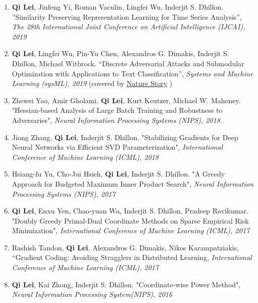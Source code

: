 \documentclass[margin, 10pt]{res} %
\begin{document}
\begin{resume}
\begin{enumerate}
  \item{ \textbf{Qi Lei}, Jinfeng Yi, Roman Vaculin, Lingfei Wu, Inderjit S. 
      Dhillon. ''Similarity Preserving Representation Learning for Time Series 
      Analysis'', \textit{The 28th International Joint Conference on Artificial 
    Intelligence (IJCAI), 2019}}
  \item{\textbf{Qi Lei}, Lingfei Wu, Pin-Yu Chen, Alexandros G. Dimakis, Inderjit S. 
    Dhillon, Michael Witbrock. ``Discrete Adversarial Attacks and Submodular 
    Optimization with Applications to Text Classification'', \textit{Systems and Machine 
  Learning (sysML), 2019} (covered by \href{https://www.nature.com/articles/d41586-019-01510-1}{Nature Story} )   }
  \item{Zhewei Yao, Amir Gholami, \textbf{Qi Lei}, Kurt Keutzer, Michael W. Mahoney. "Hessian-based Analysis of Large Batch Training and Robustness to Adversaries", \textit{Neural Information Processing Systems (NIPS), 2018}}
  \item{Jiong Zhang, \textbf{Qi Lei}, Inderjit S. Dhillon. 
       "Stabilizing Gradients for Deep 
       Neural Networks via Efficient SVD Parameterization", \textit{
    International Conference of Machine Learning (ICML), 2018}}
  \item{Hsiang-fu Yu, Cho-Jui Hsieh, \textbf{Qi Lei}, Inderjit S. Dhillon. 
      "A Greedy Approach for Budgeted Maximum 
      Inner Product Search", \textit{Neural Information Processing Systems 
      (NIPS), 2017}}
    \item{\textbf{Qi Lei}, Enxu Yen, Chao-yuan Wu, Inderjit S. Dhillon, Pradeep 
  Ravikumar. "Doubly Greedy Primal-Dual Coordinate Methods on Sparse Empirical 
  Risk Minimization", \textit{International Conference of Machine 
    Learning (ICML), 2017}}
\item{Rashish Tandon, \textbf{Qi Lei}, 
    Alexandros G. Dimakis, Nikos Karampatziakis, “Gradient Coding: Avoiding 
    Stragglers in Distributed Learning, \textit{International Conference of Machine Learning (ICML), 2017}}
  \item {\textbf{Qi Lei},
      Kai Zhong, Inderjit S. Dhillon. "Coordinate-wise Power Method", 
  \textit{Neural Information Processing System(NIPS), 2016}}		


\end{enumerate}
\end{resume}
\end{document}
